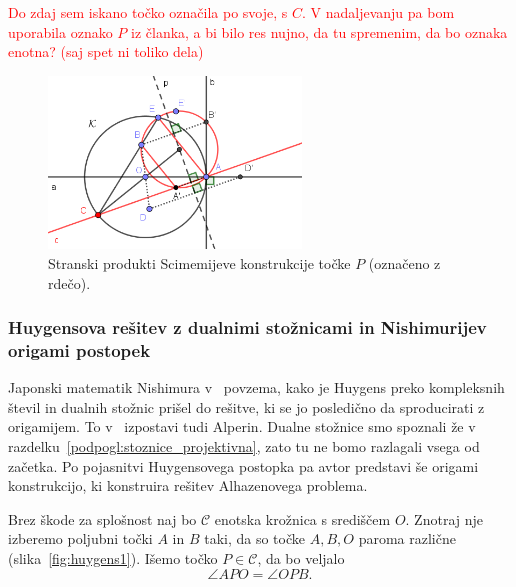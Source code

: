 \textcolor{red}{Do zdaj sem iskano točko označila po svoje, s $C$. V nadaljevanju pa bom uporabila oznako $P$ iz članka, a bi bilo res nujno, da tu spremenim, da bo oznaka enotna? (saj spet ni toliko dela)}


\begin{figure}[h]
    \centering
    \includegraphics[width=0.6\textwidth]{images/alhazen/scimemi_stransko.png}
    \caption[Stranski produkt Scimemija]{Stranski produkti Scimemijeve konstrukcije točke $P$ (označeno z rdečo).}
    \label{fig:scimemi_opomba}
\end{figure}

\subsubsection*{Huygensova rešitev z dualnimi stožnicami in Nishimurijev origami postopek}

Japonski matematik Nishimura v~\cite{nishimura2018} povzema, kako je Huygens preko kompleksnih števil in dualnih stožnic prišel do rešitve, ki se jo posledično da sproducirati z origamijem. To v~\cite{alperin2002} izpostavi tudi Alperin. Dualne stožnice smo spoznali že v razdelku~\ref{podpogl:stoznice_projektivna}, zato tu ne bomo razlagali vsega od začetka. Po pojasnitvi Huygensovega postopka pa avtor predstavi še origami konstrukcijo, ki konstruira rešitev Alhazenovega problema.

Brez škode za splošnost naj bo $\mathcal{C}$ enotska krožnica s središčem $O$. Znotraj nje izberemo poljubni točki $A$ in $B$ taki, da so točke $A,B,O$ paroma različne (slika~\ref{fig:huygens1}). Išemo točko $P \in \mathcal{C}$, da bo veljalo
\begin{equation}
    \label{eq:huygens_pogoj}
    \angle APO = \angle OPB.
\end{equation}

